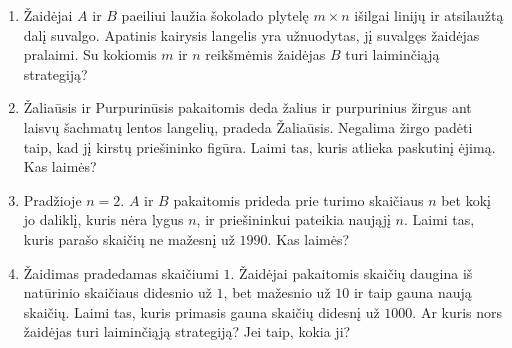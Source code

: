 \begin{enumerate}

  \item Žaidėjai $A$ ir $B$ paeiliui laužia šokolado plytelę  $m\times n$ išilgai
    linijų ir atsilaužtą dalį suvalgo. Apatinis kairysis langelis yra
    užnuodytas, jį suvalgęs žaidėjas pralaimi. Su kokiomis $m$ ir $n$ reikšmėmis
    žaidėjas $B$ turi laiminčiąją strategiją? 

  \item Žaliaūsis ir Purpurinūsis pakaitomis deda žalius ir purpurinius žirgus
    ant laisvų šachmatų lentos langelių, pradeda Žaliaūsis. Negalima žirgo
    padėti taip, kad jį kirstų priešininko figūra. Laimi tas, kuris atlieka
    paskutinį ėjimą. Kas laimės?

  \item Pradžioje $n=2$. $A$ ir $B$ pakaitomis prideda prie turimo skaičiaus $n$
    bet kokį jo daliklį, kuris nėra lygus $n$, ir priešininkui pateikia naująjį
    $n$. Laimi tas, kuris parašo skaičių ne mažesnį už $1990$. Kas laimės?

  \item Žaidimas pradedamas skaičiumi $1$. Žaidėjai pakaitomis skaičių daugina iš
    natūrinio skaičiaus didesnio už $1$, bet mažesnio už $10$ ir taip gauna naują
    skaičių. Laimi tas, kuris primasis gauna skaičių didesnį už $1000$. Ar kuris
    nors žaidėjas turi laiminčiąją strategiją? Jei taip, kokia ji?  


\end{enumerate}
